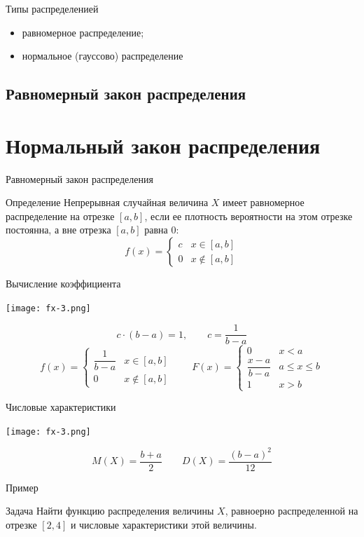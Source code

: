 \documentclass[unicode,11pt,notheorems,xcolor=table]{beamer}
\begin{document}
\begin{frame}{Типы распределенией}{}
    \begin{itemize}
        \item равномерное распределение;
        \item нормальное (гауссово) распределение
    \end{itemize}
\end{frame}
\subsection{Равномерный закон распределения}
\section{Нормальный закон распределения}
\begin{frame}{Равномерный закон распределения}{}
    \begin{block}{Определение}
        Непрерывная случайная величина $X$ имеет \alert{равномерное распределение} на отрезке $[a,b]$, если ее плотность вероятности на этом отрезке постоянна, а вне отрезка $[a,b]$ равна 0:        
        $$
            f(x) = 
            \begin{cases}
                c & x \in [a,b]\\
                0 & x \notin [a,b]
            \end{cases}
        $$
    \end{block}
\end{frame}

\begin{frame}{Вычисление коэффициента}{}
    {\centering
        \texttt{[image: fx-3.png]}
    \par}
 $$
    c \cdot(b-a) = 1, \qquad c=\frac{1}{b-a}
 $$
 $$
    f(x) = 
    \begin{cases}
        \dfrac{1}{b-a} & x \in [a,b]\\
        0 & x \notin [a,b]
    \end{cases}
    \qquad
    F(x) = 
    \begin{cases}
        0 & x < a\\
        \dfrac{x-a}{b-a} & a\leqslant x \leqslant b\\
        1 & x >b
    \end{cases}
$$
\end{frame}

\begin{frame}{Числовые характеристики}{}
    {\centering
        \texttt{[image: fx-3.png]}
    \par}
 $$
    M(X) = \frac{b+a}{2} \qquad D(X)= \frac{(b-a)^2}{12}
 $$

\end{frame}
\begin{frame}[t]{Пример}{}
    \begin{exampleblock}{Задача}
         Найти  функцию распределения величины $X$, равноерно распределенной на отрезке $[2,4]$ и числовые характеристики этой величины.
    \end{exampleblock}
\end{frame}
\end{document}
